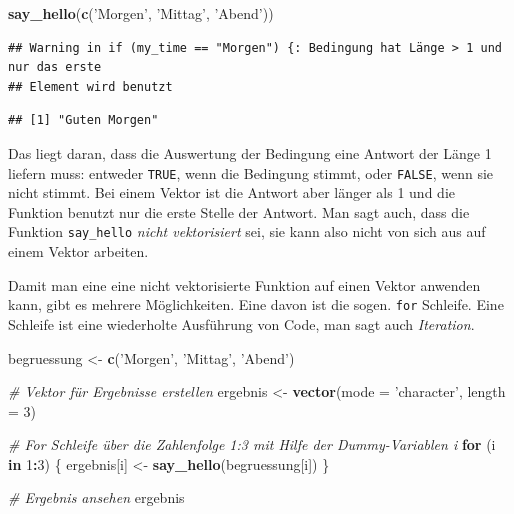\documentclass[]{book}
\newenvironment{Shaded}{\begin{snugshade}}{\end{snugshade}}
\newcommand{\CommentTok}[1]{\textcolor[rgb]{0.56,0.35,0.01}{\textit{#1}}}
\newcommand{\ControlFlowTok}[1]{\textcolor[rgb]{0.13,0.29,0.53}{\textbf{#1}}}
\newcommand{\DataTypeTok}[1]{\textcolor[rgb]{0.13,0.29,0.53}{#1}}
\newcommand{\DecValTok}[1]{\textcolor[rgb]{0.00,0.00,0.81}{#1}}
\newcommand{\KeywordTok}[1]{\textcolor[rgb]{0.13,0.29,0.53}{\textbf{#1}}}
\newcommand{\NormalTok}[1]{#1}
\newcommand{\OperatorTok}[1]{\textcolor[rgb]{0.81,0.36,0.00}{\textbf{#1}}}
\newcommand{\StringTok}[1]{\textcolor[rgb]{0.31,0.60,0.02}{#1}}
\begin{document}
\begin{Shaded}
\begin{Highlighting}[]
\KeywordTok{say_hello}\NormalTok{(}\KeywordTok{c}\NormalTok{(}\StringTok{'Morgen'}\NormalTok{, }\StringTok{'Mittag'}\NormalTok{, }\StringTok{'Abend'}\NormalTok{))}
\end{Highlighting}
\end{Shaded}

\begin{verbatim}
## Warning in if (my_time == "Morgen") {: Bedingung hat Länge > 1 und nur das erste
## Element wird benutzt
\end{verbatim}

\begin{verbatim}
## [1] "Guten Morgen"
\end{verbatim}

Das liegt daran, dass die Auswertung der Bedingung eine Antwort der Länge 1 liefern muss: entweder \texttt{TRUE}, wenn die Bedingung stimmt, oder \texttt{FALSE}, wenn sie nicht stimmt. Bei einem Vektor ist die Antwort aber länger als 1 und die Funktion benutzt nur die erste Stelle der Antwort. Man sagt auch, dass die Funktion \texttt{say\_hello} \emph{nicht vektorisiert} sei, sie kann also nicht von sich aus auf einem Vektor arbeiten.

Damit man eine eine nicht vektorisierte Funktion auf einen Vektor anwenden kann, gibt es mehrere Möglichkeiten. Eine davon ist die sogen. \texttt{for} Schleife. Eine Schleife ist eine wiederholte Ausführung von Code, man sagt auch \emph{Iteration}.

\begin{Shaded}
\begin{Highlighting}[]
\NormalTok{begruessung <-}\StringTok{ }\KeywordTok{c}\NormalTok{(}\StringTok{'Morgen'}\NormalTok{, }\StringTok{'Mittag'}\NormalTok{, }\StringTok{'Abend'}\NormalTok{)}

\CommentTok{# Vektor für Ergebnisse erstellen}
\NormalTok{ergebnis <-}\StringTok{ }\KeywordTok{vector}\NormalTok{(}\DataTypeTok{mode =} \StringTok{'character'}\NormalTok{, }\DataTypeTok{length =} \DecValTok{3}\NormalTok{)}

\CommentTok{# For Schleife über die Zahlenfolge 1:3 mit Hilfe der Dummy-Variablen i}
\ControlFlowTok{for}\NormalTok{ (i }\ControlFlowTok{in} \DecValTok{1}\OperatorTok{:}\DecValTok{3}\NormalTok{) \{}
\NormalTok{  ergebnis[i] <-}\StringTok{ }\KeywordTok{say_hello}\NormalTok{(begruessung[i])}
\NormalTok{\}}

\CommentTok{# Ergebnis ansehen}
\NormalTok{ergebnis}
\end{Highlighting}
\end{Shaded}
\end{document}
